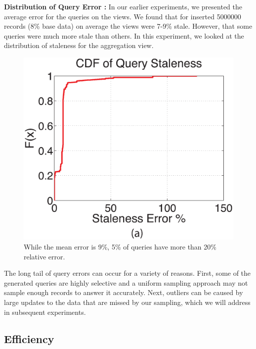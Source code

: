 {\noindent \bf Distribution of Query Error :} In our earlier experiments, we presented the average error for the queries on the views.
We found that for inserted 5000000 records (8\% base data) on average the views were 7-9\% stale. 
However, that some queries were much more stale than others.
In this experiment, we looked at the distribution of staleness for the aggregation view.

\begin{figure}[ht!]
\label{exp3dist}
\centering
 \includegraphics[scale=0.22]{exp/query_error_dist.eps}
 \caption{While the mean error is 9\%, 5\% of queries have more than 20\% relative error.}
\end{figure}

The long tail of query errors can occur for a variety of reasons.
First, some of the generated queries are highly selective and a uniform sampling approach may not sample enough records to answer it accurately.
Next, outliers can be caused by large updates to the data that are missed by our sampling, which we will address in subsequent experiments.

\subsection{Efficiency}

